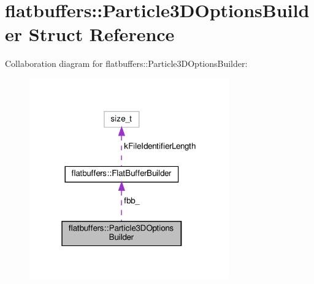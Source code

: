 \hypertarget{structflatbuffers_1_1Particle3DOptionsBuilder}{}\section{flatbuffers\+:\+:Particle3\+D\+Options\+Builder Struct Reference}
\label{structflatbuffers_1_1Particle3DOptionsBuilder}


Collaboration diagram for flatbuffers\+:\+:Particle3\+D\+Options\+Builder\+:
\nopagebreak
\begin{figure}[H]
\begin{center}
\leavevmode
\includegraphics[width=244pt]{structflatbuffers_1_1Particle3DOptionsBuilder__coll__graph}
\end{center}
\end{figure}
